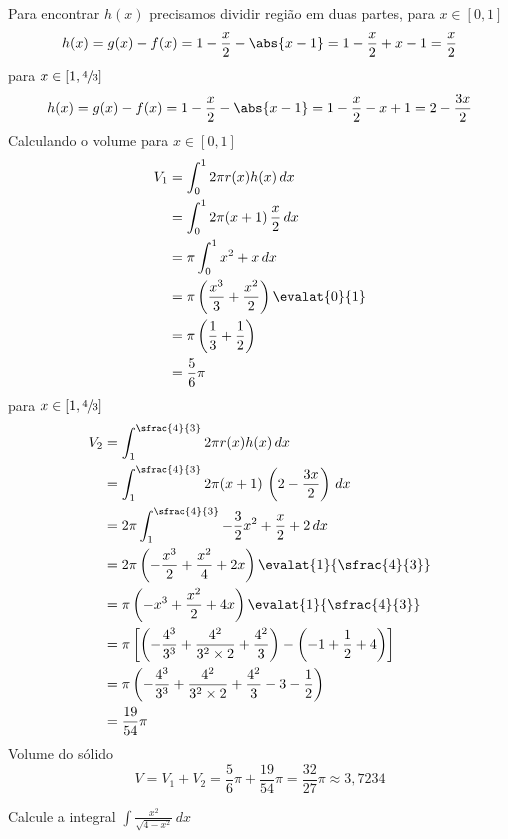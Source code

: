 \documentclass[a4paper,12pt,fleqn]{article}
\begin{document}
\begin{answer}
Para encontrar $h(x)$ precisamos dividir região em duas partes, para $x\in[0, 1]$
\[
  h(x)
  = g(x) - f(x)
  = 1 -\frac{x}{2} - \abs{x-1}
  = 1 -\frac{x}{2} + x - 1
  = \frac{x}{2}
\]
para \(x\in\left[1, \sfrac{4}{3}\right]\)
\[
  h(x)
  = g(x) - f(x)
  = 1 -\frac{x}{2} - \abs{x-1}
  = 1 -\frac{x}{2} - x + 1
  = 2 -\frac{3x}{2}
\]
Calculando o volume para $x\in[0, 1]$
\begin{align*}
  V_1
  & = \int_0^1 2\pi r(x) h(x) \, dx \\
  & = \int_0^1 2\pi (x+1) \, \frac{x}{2}  \, dx \\
  & = \pi \int_0^1 x^2 + x\,  dx \\
  & = \pi \left(\frac{x^3}{3} + \frac{x^2}{2}\right)\evalat{0}{1}  \\
  & = \pi \left(\frac{1}{3} + \frac{1}{2}\right)  \\
  & = \frac{5}{6}\pi
\end{align*}
para \(x\in\left[1, \sfrac{4}{3}\right]\)
\begin{align*}
  V_2
  & = \int_1^{\sfrac{4}{3}} 2\pi r(x) h(x) \, dx \\
  & = \int_1^{\sfrac{4}{3}} 2\pi (x+1) \, \left(2 -\frac{3x}{2}\right)  \, dx \\
  & = 2\pi \int_1^{\sfrac{4}{3}} -\frac{3}{2}x^2 + \frac{x}{2} + 2 \, dx \\
  & = 2\pi \left(-\frac{x^3}{2} + \frac{x^2}{4} + 2x \right)\evalat{1}{\sfrac{4}{3}}  \\
  & = \pi \left(-x^3 + \frac{x^2}{2} + 4x \right)\evalat{1}{\sfrac{4}{3}}  \\
  & = \pi
  \left[
    \left(-\frac{4^3}{3^3} + \frac{4^2}{3^2\times2} + \frac{4^2}{3}\right)-
    \left(-1 + \frac{1}{2} + 4\right)
   \right] \\
   & = \pi
   \left(-\frac{4^3}{3^3} + \frac{4^2}{3^2\times2} + \frac{4^2}{3} -3 -\frac{1}{2}\right) \\
   & = \frac{19}{54}\pi
\end{align*}
Volume do sólido
\[
  V
  = V_1 + V_2
  = \frac{5}{6}\pi + \frac{19}{54}\pi
  = \frac{32}{27}\pi
  \approx 3,7234
\]
\end{answer}

Calcule a integral
\(
  \int \frac{x^2}{\sqrt{4-x^2}}\,dx
\)
\end{document}
